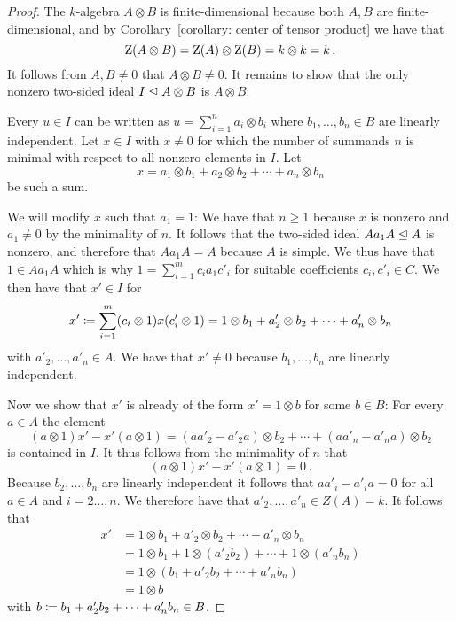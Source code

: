 \begin{proof}
  The $k$-algebra $A \otimes B$ is finite-dimensional because both $A, B$ are finite-di\-men\-si\-o\-nal, and by Corollary~\ref{corollary: center of tensor product} we have that
  \[
      \operatorname{Z}(A \otimes B)
    = \operatorname{Z}(A) \otimes \operatorname{Z}(B)
    = k \otimes k
    = k \,.
  \]
  It follows from $A, B \neq 0$ that $A \otimes B \neq 0$.
  It remains to show that the only nonzero two-sided ideal $I \trianglelefteq A \otimes B$ is $A \otimes B$:
  
  Every $u \in I$ can be written as $u = \sum_{i=1}^n a_i \otimes b_i$ where $b_1, \dotsc, b_n \in B$ are linearly independent.
  Let $x \in I$ with $x \neq 0$ for which the number of summands $n$ is minimal with respect to all nonzero elements in $I$.
  Let
  \begin{equation}
    \label{eqn: u as a sum}
      x
    = a_1 \otimes b_1 + a_2 \otimes b_2 + \dotsb + a_n \otimes b_n
  \end{equation}
  be such a sum.
  
  We will modify $x$ such that $a_1 = 1$:
  We have that $n \geq 1$ because $x$ is nonzero and $a_1 \neq 0$ by the minimality of $n$.
  It follows that the two-sided ideal $A a_1 A \trianglelefteq A$ is nonzero, and therefore that $A a_1 A = A$ because $A$ is simple.
  We thus have that $1 \in A a_1 A$ which is why $1 = \sum_{i=1}^m c_i a_1 c'_i$ for suitable coefficients $c_i, c'_i \in C$.
  We then have that $x' \in I$ for
  \[
              x'
    \coloneqq  \sum_{i=1}^m (c_i \otimes 1) x (c'_i \otimes 1)
    =         1 \otimes b_1 + a'_2 \otimes b_2 + \dotsb + a'_n \otimes b_n
  \]
  with $a'_2, \dotsc, a'_n \in A$.
  We have that $x' \neq 0$ because $b_1, \dotsc, b_n$ are linearly independent.
  
  Now we show that $x'$ is already of the form $x' = 1 \otimes b$ for some $b \in B$:
  For every $a \in A$ the element
  \[
        (a \otimes 1) x' - x' (a \otimes 1)
    =     (a a'_2 - a'_2 a) \otimes b_2
        + \dotsb
        + (a a'_n - a'_n a) \otimes b_2
  \]
  is contained in $I$.
  It thus follows from the minimality of $n$ that
  \[
      (a \otimes 1) x' - x' (a \otimes 1)
    = 0 \,.
  \]
  Because $b_2, \dotsc, b_n$ are linearly independent it follows that $a a'_i - a'_i a = 0$ for all $a \in A$ and $i = 2 \dotsc, n$.
  We therefore have that $a'_2, \dotsc, a'_n \in Z(A) = k$.
  It follows that
  \begin{align*}
        x'
    &=  1 \otimes b_1 + a'_2 \otimes b_2 + \dotsb + a'_n \otimes b_n  \\
    &=  1 \otimes b_1 + 1 \otimes (a'_2 b_2) + \dotsb + 1 \otimes (a'_n b_n)  \\
    &=  1 \otimes (b_1 + a'_2 b_2 + \dotsb + a'_n b_n)  \\
    &=  1 \otimes b
  \end{align*}
  with $b \coloneqq b_1 + a'_2 b_2 + \dotsb + a'_n b_n \in B$.
  

\end{proof}
